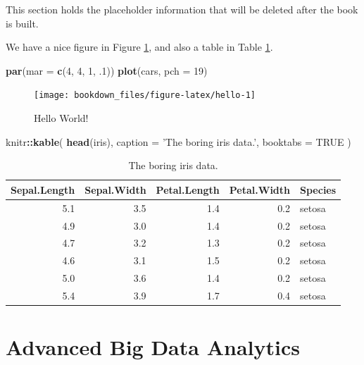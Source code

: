 \documentclass[]{krantz}
\makeatletter
\newenvironment{Shaded}{\begin{snugshade}}{\end{snugshade}}
\newcommand{\KeywordTok}[1]{\textcolor[rgb]{0.27,0.27,0.27}{\textbf{#1}}}
\newcommand{\DataTypeTok}[1]{\textcolor[rgb]{0.27,0.27,0.27}{#1}}
\newcommand{\DecValTok}[1]{\textcolor[rgb]{0.06,0.06,0.06}{#1}}
\newcommand{\StringTok}[1]{\textcolor[rgb]{0.5,0.5,0.5}{#1}}
\newcommand{\OtherTok}[1]{\textcolor[rgb]{0.56,0.35,0.01}{#1}}
\newcommand{\OperatorTok}[1]{\textcolor[rgb]{0.81,0.36,0.00}{\textbf{#1}}}
\newcommand{\NormalTok}[1]{#1}
\newenvironment{kframe}{%
\medskip{}
\setlength{\fboxsep}{.8em}
 \def\at@end@of@kframe{}%
 \ifinner\ifhmode%
  \def\at@end@of@kframe{\end{minipage}}%
  \begin{minipage}{\columnwidth}%
 \fi\fi%
 \def\FrameCommand##1{\hskip\@totalleftmargin \hskip-\fboxsep
 \colorbox{shadecolor}{##1}\hskip-\fboxsep
     \hskip-\linewidth \hskip-\@totalleftmargin \hskip\columnwidth}%
 \MakeFramed {\advance\hsize-\width
   \@totalleftmargin\z@ \linewidth\hsize
   \@setminipage}}%
 {\par\unskip\endMakeFramed%
 \at@end@of@kframe}
\renewenvironment{Shaded}{\begin{kframe}}{\end{kframe}}
\theoremstyle{definition}
\theoremstyle{definition}
\theoremstyle{definition}
\theoremstyle{remark}
\makeatother
\begin{document}
This section holds the placeholder information that will be deleted
after the book is built.

We have a nice figure in Figure \ref{fig:hello}, and also a table in
Table \ref{tab:iris}.

\begin{Shaded}
\begin{Highlighting}[]
\KeywordTok{par}\NormalTok{(}\DataTypeTok{mar =} \KeywordTok{c}\NormalTok{(}\DecValTok{4}\NormalTok{, }\DecValTok{4}\NormalTok{, }\DecValTok{1}\NormalTok{, .}\DecValTok{1}\NormalTok{))}
\KeywordTok{plot}\NormalTok{(cars, }\DataTypeTok{pch =} \DecValTok{19}\NormalTok{)}
\end{Highlighting}
\end{Shaded}

\begin{figure}
\texttt{[image: bookdown\_files/figure-latex/hello-1]} \caption{Hello World!}\label{fig:hello}
\end{figure}

\begin{Shaded}
\begin{Highlighting}[]
\NormalTok{knitr}\OperatorTok{::}\KeywordTok{kable}\NormalTok{(}
  \KeywordTok{head}\NormalTok{(iris), }\DataTypeTok{caption =} \StringTok{'The boring iris data.'}\NormalTok{,}
  \DataTypeTok{booktabs =} \OtherTok{TRUE}
\NormalTok{)}
\end{Highlighting}
\end{Shaded}

\begin{table}

\caption{\label{tab:iris}The boring iris data.}
\centering
\begin{tabular}[t]{rrrrl}
\toprule
Sepal.Length & Sepal.Width & Petal.Length & Petal.Width & Species\\
\midrule
5.1 & 3.5 & 1.4 & 0.2 & setosa\\
4.9 & 3.0 & 1.4 & 0.2 & setosa\\
4.7 & 3.2 & 1.3 & 0.2 & setosa\\
4.6 & 3.1 & 1.5 & 0.2 & setosa\\
5.0 & 3.6 & 1.4 & 0.2 & setosa\\
5.4 & 3.9 & 1.7 & 0.4 & setosa\\
\bottomrule
\end{tabular}
\end{table}

\chapter{Advanced Big Data Analytics}\label{advanced-big-data-analytics}
\end{document}
